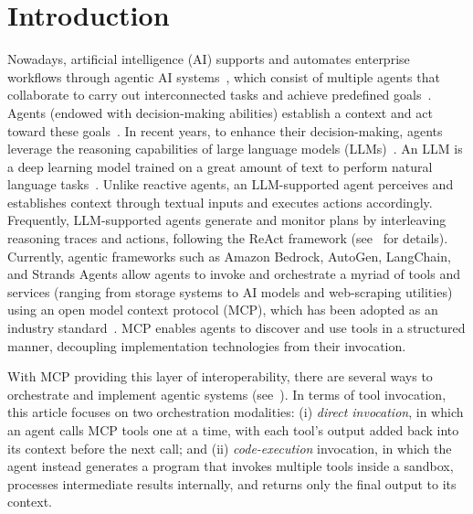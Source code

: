 \documentclass[runningheads]{llncs}
\begin{document}
\section{Introduction}

Nowadays, artificial intelligence (AI) supports and automates enterprise workflows through agentic AI systems~\cite{godavarthi2026investment}, which consist of multiple agents that collaborate to carry out interconnected tasks and achieve predefined goals~\cite{sapkota2025ai}. Agents (endowed with decision-making abilities) establish a context and act toward these goals~\cite{bandi2025rise}. In recent years, to enhance their decision-making, agents leverage the reasoning capabilities of large language models (LLMs)~\cite{naveed2025comprehensive}. An LLM is a deep learning model trained on a great amount of text to perform natural language tasks~\cite{huang2024auditwen}. Unlike reactive agents, an LLM-supported agent perceives and establishes context through textual inputs and executes actions accordingly. Frequently, LLM-supported agents generate and monitor plans by interleaving reasoning traces and actions, following the ReAct framework (see~\cite{yao2022react} for details). Currently, agentic frameworks such as Amazon Bedrock, AutoGen, LangChain, and Strands Agents allow agents to invoke and orchestrate a myriad of tools and services (ranging from storage systems to AI models and web-scraping utilities) using an open model context protocol (MCP), which has been adopted as an industry standard~\cite{hou2025model}. MCP enables agents to discover and use tools in a structured manner, decoupling implementation technologies from their invocation.

With MCP providing this layer of interoperability, there are several ways to orchestrate and implement agentic systems (see~\cite{aws2025_mcp_agentcore_bedrock}). In terms of tool invocation, this article focuses on two orchestration modalities: (i) \textit{direct invocation}, in which an agent calls MCP tools one at a time, with each tool’s output added back into its context before the next call; and (ii) \textit{code-execution} invocation, in which the agent instead generates a program that invokes multiple tools inside a sandbox, processes intermediate results internally, and returns only the final output to its context.
\end{document}
